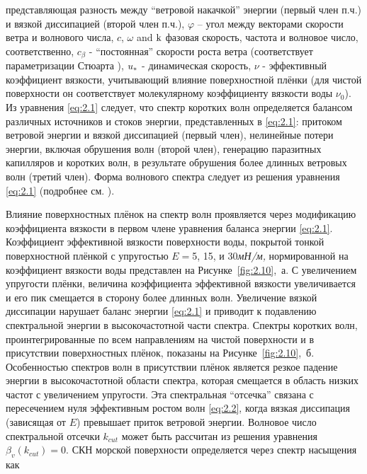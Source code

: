 \noindent представляющая разность между ``ветровой накачкой'' энергии (первый член п.ч.) и вязкой диссипацией (второй член п.ч.), $\varphi $ -- угол между векторами скорости ветра и волнового числа, $c$, $\omega $ and ${\rm k}$ фазовая скорость, частота и волновое число, соответственно, $c_{\beta } $ - ``постоянная'' скорости роста ветра (соответствует параметризации Стюарта \citep{Stewart1974}), $u_{{\rm *}} $ - динамическая скорость, $\nu $ - эффективный коэффициент вязкости, учитывающий влияние поверхностной плёнки (для чистой поверхности он соответствует молекулярному коэффициенту вязкости воды $\nu _{0} $). Из уравнения \eqref{eq:2.1} следует, что спектр коротких волн определяется балансом различных источников и стоков энергии, представленных в \eqref{eq:2.1}: притоком ветровой энергии и вязкой диссипацией (первый член), нелинейные потери энергии, включая обрушения волн (второй член), генерацию паразитных капилляров и коротких волн, в результате обрушения более длинных ветровых волн (третий член). Форма волнового спектра следует из решения уравнения \eqref{eq:2.1} (подробнее см. \citep{Kudryavtsev2005, 2008}).

Влияние поверхностных плёнок на спектр волн проявляется через модификацию коэффициента вязкости в первом члене уравнения баланса энергии \eqref{eq:2.1}.
Коэффициент эффективной вязкости поверхности воды, покрытой тонкой поверхностной плёнкой с упругостью $E=$5, 15, и 30\textit{мН/м,} нормированной на коэффициент вязкости воды представлен на Рисунке~\ref{fig:2.10},~а. С увеличением упругости плёнки, величина коэффициента эффективной вязкости увеличивается и его пик смещается в сторону более длинных волн. Увеличение вязкой диссипации нарушает баланс энергии \eqref{eq:2.1} и приводит к подавлению спектральной энергии в высокочастотной части спектра. Спектры коротких волн, проинтегрированные по всем направлениям на чистой поверхности и в присутствии поверхностных плёнок, показаны на Рисунке~\ref{fig:2.10},~б. Особенностью спектров волн в присутствии плёнок является резкое падение энергии в высокочастотной области спектра, которая смещается в область низких частот с увеличением упругости. Эта спектральная ``отсечка'' связана с пересечением нуля эффективным ростом волн \eqref{eq:2.2}, когда вязкая диссипация (зависящая от $E$) превышает приток ветровой энергии. Волновое число спектральной отсечки $k_{cut} $ может быть рассчитан из решения уравнения $\beta _{v} (k_{cut} )=0$. СКН морской поверхности определяется через спектр насыщения как



